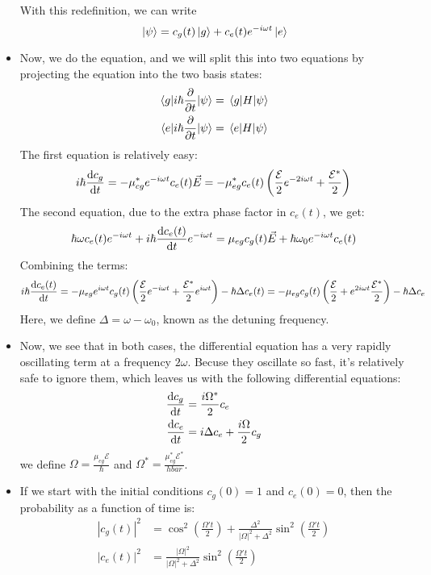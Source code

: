 \begin{itemize}
		With this redefinition, we can write 
		\[
		\ket*{\psi} = c_g(t) \ket*{g} + c_e(t) e^{- i \omega t} \ket*{e}
		\] 
	\item Now, we do the \schrodinger equation, and we will split this into two equations by projecting the 
		\schrodinger equation into the two basis states:
		\begin{align*}
			\mel{g}{i \hbar \pdv{t}}{\psi} &= \mel{g}{H}{\psi} \\
			\mel{e}{i\hbar \pdv{t}}{\psi} &= \mel{e}{H}{\psi}
		\end{align*}
		The first equation is relatively easy:
		\[
			i\hbar \dv{c_g}{t} = -\mu_{cg}^{*} e^{- i \omega t}c_e(t) \vec E
			= - \mu_{eg}^{*}c_e(t) \left( \frac{\mathcal E}{2} e^{- 2 i \omega t}
			+ \frac{\mathcal E^{*}}{2}\right) 
		\] 
		The second equation, due to the extra phase factor in \( c_e(t) \), we get:
		\[
			\hbar \omega c_e(t) e^{- i \omega t} + i \hbar \dv{c_e(t)}{t} e^{-i \omega t} = 
			\mu_{eg} c_g(t) \vec E + \hbar \omega_0 e^{-i \omega t}c_e(t)
		\] 
		Combining the terms:
		\[
			i\hbar \dv{c_e(t)}{t} = -\mu_{eg}e^{i \omega t}c_g(t) \left( \frac{\mathcal E}{2} 
			e^{- i \omega t} + \frac{\mathcal E^{*}}{2} e^{i \omega t}\right) - \hbar \Delta c_e(t)
			= -\mu_{eg}c_g(t)\left( \frac{\mathcal E}{2} + e^{2 i \omega t} 
			\frac{\mathcal E^{*}}{2}\right) - \hbar \Delta c_e
		\] 
		Here, we define \( \Delta = \omega - \omega_0 \), known as the detuning frequency. 
	\item Now, we see that in both cases, the differential equation has a very rapidly oscillating term 
		at a frequency \( 2 \omega \). Becuse they oscillate so fast, it's relatively safe to ignore them, which 
		leaves us with the following differential equations:
		\begin{align*}
			\dv{c_g}{t} &= \frac{i \Omega^{*}}{2}c_e\\
			\dv{c_e}{t} &= i \Delta c_e  + \frac{i \Omega}{2}c_g
		\end{align*}
		we define \( \Omega = \frac{\mu_{eg}\mathcal E}{\hbar} \) and 
		\( \Omega^{*} = \frac{\mu_{eg}^{*} \mathcal E^{*}}{hbar} \).
	\item If we start with the initial conditions \( c_g(0) = 1 \) and \( c_e(0) = 0 \), then the probability 
		as a function of time is:
		\begin{align*}
			|c_g(t)|^2 &= \cos^2\left( \frac{\Omega' t}{2} \right) + \frac{\Delta^2}{|\Omega|^2 + \Delta^2}
		\sin^2\left( \frac{\Omega' t}{2} \right) \\
		|c_e(t)|^2 &= \frac{|\Omega|^2}{|\Omega|^2 + \Delta^2} \sin^2\left( \frac{\Omega' t}{2} \right)  

\end{align*}
\end{itemize}
